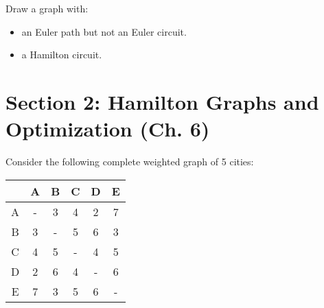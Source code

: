 \documentclass[12pt]{exam}
\begin{document}
\begin{questions}
\newpage
\question[4] Draw a graph with:
\begin{itemize}
\item an Euler path but not an Euler circuit.
\item a Hamilton circuit.
\end{itemize}

\newpage

\section*{Section 2: Hamilton Graphs and Optimization (Ch. 6)}

\question Consider the following complete weighted graph of 5 cities:

\begin{center}
\begin{tabular}{c|ccccc}
 & A & B & C & D & E \\
\hline
A & - & 3 & 4 & 2 & 7 \\
B & 3 & - & 5 & 6 & 3 \\
C & 4 & 5 & - & 4 & 5 \\
D & 2 & 6 & 4 & - & 6 \\
E & 7 & 3 & 5 & 6 & - \\
\end{tabular}
\end{center}

\end{questions}
\end{document}
